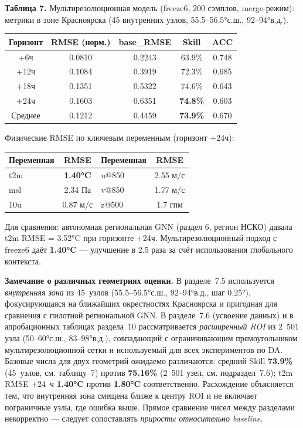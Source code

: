 \documentclass[14pt,a4paper]{extarticle}
\newcounter{none}
\numberwithin{table}{section}
\numberwithin{figure}{section}
\numberwithin{equation}{section}
\begin{document}
\textbf{Таблица 7.} Мультирезолюционная модель (freeze6, 200 сэмплов,
merge-режим): метрики в зоне Красноярска (45 внутренних узлов,
55.5--56.5°с.ш., 92--94°в.д.).

{\def\LTcaptype{none} %
\begin{longtable}[]{@{}ccccc@{}}
\toprule\noalign{}
Горизонт & RMSE (норм.) & base\_RMSE & Skill & ACC \\
\midrule\noalign{}
\endhead
\bottomrule\noalign{}
\endlastfoot
+6ч & 0.0810 & 0.2243 & 63.9\% & 0.748 \\
+12ч & 0.1084 & 0.3919 & 72.3\% & 0.685 \\
+18ч & 0.1351 & 0.5322 & 74.6\% & 0.643 \\
+24ч & 0.1603 & 0.6351 & \textbf{74.8\%} & 0.603 \\
Среднее & 0.1212 & 0.4459 & \textbf{73.9\%} & 0.670 \\
\end{longtable}
}

Физические RMSE по ключевым переменным (горизонт +24ч):

{\def\LTcaptype{none} %
\begin{longtable}[]{@{}lclc@{}}
\toprule\noalign{}
Переменная & RMSE & Переменная & RMSE \\
\midrule\noalign{}
\endhead
\bottomrule\noalign{}
\endlastfoot
t2m & \textbf{1.40°C} & u@850 & 2.55 м/с \\
msl & 2.34 Па & v@850 & 1.77 м/с \\
10u & 0.87 м/с & z@500 & 1.7 гпм \\
\end{longtable}
}

Для сравнения: автономная региональная GNN (раздел 6, регион НСКО)
давала t2m RMSE = 3.52°C при горизонте +24ч. Мультирезолюционный подход
с freeze6 даёт \textbf{1.40°C} --- улучшение в 2.5 раза за счёт
использования глобального контекста.

\textbf{Замечание о различных геометриях оценки.} В разделе~7.5
используется \emph{внутренняя зона} из 45~узлов (55.5--56.5°с.ш.,
92--94°в.д., шаг 0.25°), фокусирующаяся на ближайших окрестностях
Красноярска и пригодная для сравнения с пилотной региональной GNN.
В разделе~7.6 (усвоение данных) и в апробационных таблицах раздела~10
рассматривается \emph{расширенный ROI} из 2~501 узла (50--60°с.ш.,
83--98°в.д.), совпадающий с ограничивающим прямоугольником
мультирезолюционной сетки и используемый для всех экспериментов
по DA. Базовые числа для двух геометрий ожидаемо различаются: средний
Skill \textbf{73.9\%} (45~узлов, см. таблицу~7) против
\textbf{75.16\%} (2~501 узел, см. подраздел~7.6); t2m RMSE +24~ч
\textbf{1.40°C} против \textbf{1.80°C} соответственно. Расхождение
объясняется тем, что внутренняя зона смещена ближе к центру ROI
и не включает пограничные узлы, где ошибка выше. Прямое сравнение
чисел между разделами некорректно --- следует сопоставлять
\emph{приросты относительно baseline}.
\end{document}
